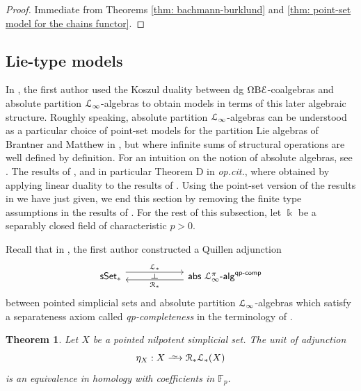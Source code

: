 \documentclass[a4paper,12pt]{amsart}
\renewcommand{\mathcal}{\EuScript}
\theoremstyle{plain}
\newtheorem{theorem}{Theorem}[section]
\theoremstyle{definition}
\theoremstyle{remark}
\newcommand{\qi}{\xrightarrow{ \,\smash{\raisebox{-0.65ex}{\ensuremath{\scriptstyle\sim}}}\,}}
\newcommand{\kk}{\Bbbk}
\begin{document}
\begin{proof}
Immediate from Theorems \ref{thm: bachmann-burklund} and \ref{thm: point-set model for the chains functor}. 
\end{proof}

\subsection{Lie-type models}
In \cite{lucio2024higherlietheorypositive}, the first author used the Koszul duality between dg $\Omega\mathrm{B} \mathcal{E}$-coalgebras and absolute partition $\mathcal{L}_\infty$-algebras to obtain models in terms of this later algebraic structure. Roughly speaking, absolute partition $\mathcal{L}_\infty$-algebras can be understood as a particular choice of point-set models for the partition Lie algebras of Brantner and Matthew in \cite{brantnermathew}, but where infinite sums of structural operations are well defined by definition. For an intuition on the notion of absolute algebras, see \cite{absolutealgebras}. The results of \cite{lucio2024higherlietheorypositive}, and in particular Theorem D in \textit{op.cit.}, where obtained by applying linear duality to the results of \cite{Mandell01}. Using the point-set version of the results in \cite{bachmann2024} we have just given, we end this section by removing the finite type assumptions in the results of \cite{lucio2024higherlietheorypositive}. For the rest of this subsection, let $\kk$ be a separably closed field of characteristic $p >0$. 


Recall that in \cite{lucio2024higherlietheorypositive}, the first author constructed a Quillen adjunction 
\[
\begin{tikzcd}[column sep=5pc,row sep=3pc]
          \mathsf{sSet}_* \arrow[r, shift left=1.1ex, "\mathcal{L}_*"{name=A}]
          &\mathsf{abs}~\mathcal{L}_\infty^\pi\text{-}\mathsf{alg}^{\mathsf{qp}\text{-}\mathsf{comp}} \arrow[l, shift left=.75ex, "\mathcal{R}_*"{name=B}]
           \arrow[phantom, from=A, to=B, , "\dashv" rotate=-90]
\end{tikzcd}
\]
between pointed simplicial sets and absolute partition $\mathcal{L}_\infty$-algebras which satisfy a separateness axiom called \textit{qp-completeness} in the terminology of \cite{premierpapier}. 

\begin{theorem}
Let $X$ be a pointed nilpotent simplicial set. The unit of adjunction
\[
\eta_X: X \qi \mathcal{R}_*\mathcal{L}_*(X) 
\]
is an equivalence in homology with coefficients in $\mathbb{F}_p$. 
\end{theorem}
\end{document}
